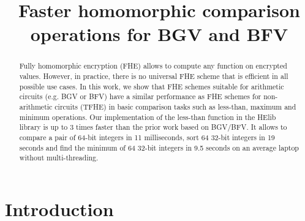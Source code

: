 \documentclass[USenglish,oneside,twocolumn]{article}
\theoremstyle{remark}
\begin{document}
 







  \title{Faster homomorphic comparison operations for BGV and BFV}



  \begin{abstract} 
  {Fully homomorphic encryption (FHE) allows to compute any function on encrypted values.
  However, in practice, there is no universal FHE scheme that is efficient in all possible use cases.
  In this work, we show that FHE schemes suitable for arithmetic circuits (e.g. BGV or BFV) have a similar performance as FHE schemes for non-arithmetic circuits (TFHE) in basic comparison tasks such as less-than, maximum and minimum operations.
  Our implementation of the less-than function in the HElib library is up to 3 times faster than the prior work based on BGV/BFV.
  It allows to compare a pair of 64-bit integers in 11 milliseconds, sort 64 32-bit integers in 19 seconds and find the minimum of 64 32-bit integers in 9.5 seconds on an average laptop without multi-threading.}     
  \end{abstract}


 

\maketitle

\section{Introduction}
\label{sec:introduction}

\end{document}
